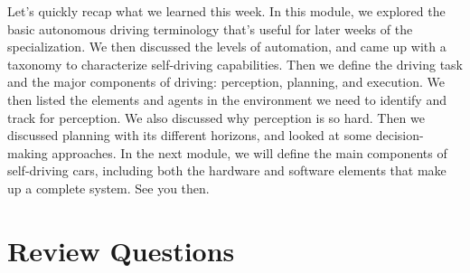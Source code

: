 Let's quickly recap what we learned this week. In this module, we explored the basic autonomous driving terminology that's useful for later weeks of the specialization. We then discussed the levels of automation, and came up with a taxonomy to characterize self-driving capabilities. Then we define the driving task and the major components of driving: perception, planning, and execution. We then listed the elements and agents in the environment we need to identify and track for perception. We also discussed why perception is so hard. Then we discussed planning with its different horizons, and looked at some decision-making approaches. In the next module, we will define the main components of self-driving cars, including both the hardware and software elements that make up a complete system. See you then.


\section{Review Questions}
\label{review_questions_chapter_1}

